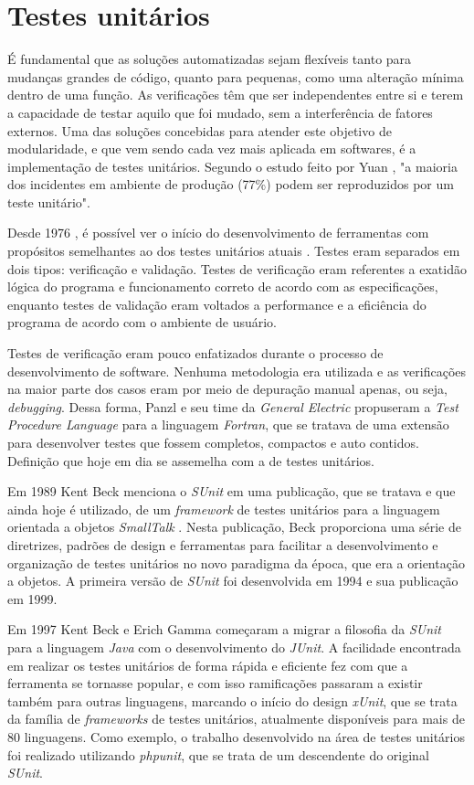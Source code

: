 \hypertarget{testes-unitarios}{%
\section{Testes unitários}\label{testes-unitarios}}

É fundamental que as soluções automatizadas sejam flexíveis tanto para mudanças grandes de código, quanto para pequenas, como uma alteração mínima dentro de uma função. As verificações têm que ser independentes entre si e terem a capacidade de testar aquilo que foi mudado, sem a interferência de fatores externos. Uma das soluções concebidas para atender este objetivo de modularidade, e que vem sendo cada vez mais aplicada em softwares, é a implementação de testes unitários. Segundo o estudo feito por Yuan \cite{yuan}, "a maioria dos incidentes em ambiente de produção (77\%) podem ser reproduzidos por um teste unitário".

Desde 1976 , é possível ver o início do desenvolvimento de ferramentas com propósitos semelhantes ao dos testes unitários atuais \cite{panzl}. Testes eram separados em dois tipos: verificação e validação. Testes de verificação eram referentes a exatidão lógica do programa e funcionamento correto de acordo com as especificações, enquanto testes de validação eram voltados a performance e a eficiência do programa de acordo com o ambiente de usuário.

Testes de verificação eram pouco enfatizados durante o processo de desenvolvimento de software. Nenhuma metodologia era utilizada e as verificações na maior parte dos casos eram por meio de depuração manual apenas, ou seja, \emph{debugging}. Dessa forma, Panzl e seu time da \emph{General Electric} propuseram a \emph{Test Procedure Language} para a linguagem \emph{Fortran}, que se tratava de uma extensão para desenvolver testes que fossem completos, compactos e auto contidos. Definição que hoje em dia se assemelha com a de testes unitários.

Em 1989 Kent Beck menciona o \emph{SUnit} em uma publicação, que se tratava e que ainda hoje é utilizado, de um \emph{framework} de testes unitários para a linguagem orientada a objetos \emph{SmallTalk} \cite{beck2}. Nesta publicação, Beck proporciona uma série de diretrizes, padrões de design e ferramentas para facilitar a desenvolvimento e organização de testes unitários no novo paradigma da época, que era a orientação a objetos. A primeira versão de \emph{SUnit} foi desenvolvida em 1994 e sua publicação em 1999.

Em 1997 Kent Beck e Erich Gamma começaram a migrar a filosofia da \emph{SUnit} para a linguagem \emph{Java} com o desenvolvimento do \emph{JUnit}. A facilidade encontrada em realizar os testes unitários de forma rápida e eficiente fez com que a ferramenta se tornasse popular, e com isso ramificações passaram a existir também para outras linguagens, marcando o início do design \emph{xUnit}, que se trata da família de \emph{frameworks} de testes unitários, atualmente disponíveis para mais de 80 linguagens. Como exemplo, o trabalho desenvolvido na área de testes unitários foi realizado utilizando \emph{phpunit}, que se trata de um descendente do original \emph{SUnit}.

